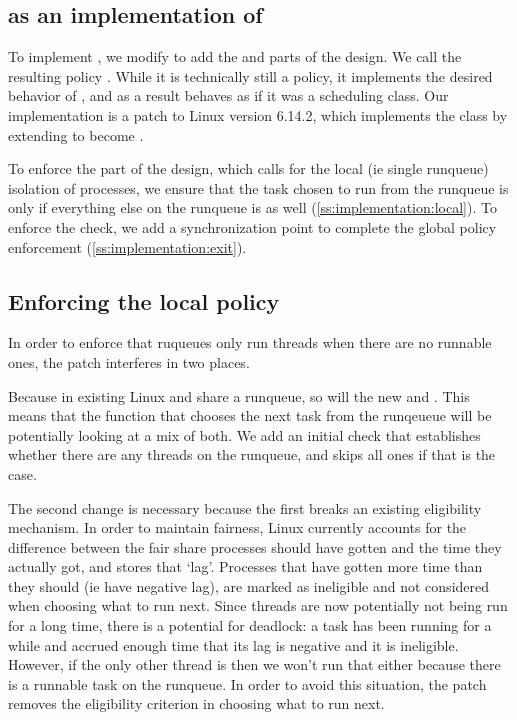 \subsection{\schedbe{} as an implementation of \beclass{}}

To implement \beclass{}, we modify \schedidle{} to add the \local{} and \exit{}
parts of the \beclass{} design. We call the resulting policy \schedbe{}. While
it is technically still a policy, it implements the desired behavior of
\beclass{}, and as a result behaves as if it was a scheduling class. Our
implementation is a patch to Linux version 6.14.2, which implements the
\beclass{} class by extending \schedidle{} to become \schedbe{}.

To enforce the \local{} part of the design, which calls for the local (ie single
runqueue) isolation of \schedbe{} processes, we ensure that the task chosen to
run from the runqueue is only \schedbe{} if everything else on the runqueue is
as well (\autoref{ss:implementation:local}). To enforce the \exit{} check, we
add a synchronization point to complete the global policy enforcement
(\autoref{ss:implementation:exit}).

\subsection{Enforcing the local policy}\label{ss:implementation:local}

In order to enforce that ruqueues only run \schedbe{} threads when there are no
runnable \schednormal{} ones, the patch interferes in two places. 

Because in existing Linux \schedidle{} and \schednormal{} share a runqueue, so
will the new \schedbe{} and \schednormal{}. This means
that the function that chooses the next task from the runqeueue will be
potentially looking at a mix of both. We add an initial check that establishes
whether there are any \schednormal{} threads on the runqueue, and skips all
\schedbe{} ones if that is the case. 

The second change is necessary because the first breaks an existing eligibility
mechanism. In order to maintain fairness, Linux currently accounts for the
difference between the fair share processes should have gotten and the time they
actually got, and stores that `lag'. Processes that have gotten more time than
they should (ie have negative lag), are marked as ineligible and not considered
when choosing what to run next. Since \schedbe{} threads are now potentially not
being run for a long time, there is a potential for deadlock: a \schednormal{}
task has been running for a while and accrued enough time that its lag is
negative and it is ineligible. However, if the only other thread is \schedbe{}
then we won't run that either because there is a runnable \schednormal{} task on
the runqueue. In order to avoid this situation, the patch removes the
eligibility criterion in choosing what to run next.


